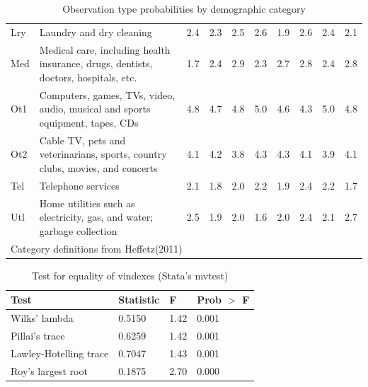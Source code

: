 \documentclass[11pt]{article}
\begin{document}
\begin{CJK}{UTF8}{gbsn}
\begin{table}[!ht]
{\begin{tabular}{lp{40mm}llllllll}
        Lry & {\tiny  Laundry and dry cleaning}& 2.4 & 2.3 & 2.5 & 2.6 & 1.9 & 2.6 & 2.4 & 2.1\\
        Med & {\tiny  Medical care, including health insurance, drugs, dentists, doctors, hospitals, etc.}& 1.7 & 2.4 & 2.9 & 2.3 & 2.7 & 2.8 & 2.4 & 2.8\\
        Ot1 & {\tiny  Computers, games, TVs, video, audio, musical and sports equipment, tapes, CDs}& 4.8 & 4.7 & 4.8 & 5.0 & 4.6 & 4.3 & 5.0 & 4.8\\
        Ot2 & {\tiny  Cable TV, pets and veterinarians, sports, country clubs, movies, and concerts}& 4.1 & 4.2 & 3.8 & 4.3 & 4.3 & 4.1 & 3.9 & 4.1\\
        Tel & {\tiny  Telephone services}& 2.1 & 1.8 & 2.0 & 2.2 & 1.9 & 2.4 & 2.2 & 1.7\\
        Utl & {\tiny  Home utilities such as electricity, gas, and water; garbage collection}& 2.5 & 1.9 & 2.0 & 1.6 & 2.0 & 2.4 & 2.1 & 2.7\\
        \hline
        \multicolumn{9}{l}{\tiny *Category definitions from Heffetz(2011)}
    \end{tabular}
    }%
    \caption{Observation type probabilities by demographic category}
    \label{tab:dem_vin}
\end{table}

\begin{table}[!ht]
    


\end{table}

\begin{table}[!ht]
    \centering
    {\footnotesize
    \begin{tabular}{llll}
        \hline\hline
        Test                   & Statistic & F    & Prob $>$ F \\
        \hline
        Wilks' lambda          & 0.5150    & 1.42 & 0.001 \\
        Pillai's trace         & 0.6259    & 1.42 & 0.001 \\
        Lawley-Hotelling trace & 0.7047    & 1.43 & 0.001 \\
        Roy's largest root     & 0.1875    & 2.70 & 0.000 \\
        \hline
    \end{tabular}
    }%
    \caption{{\small Test for equality of vindexes (Stata's mvtest)}}
    \label{tab:dem_vin}
\end{table}


\end{CJK}
\end{document}
